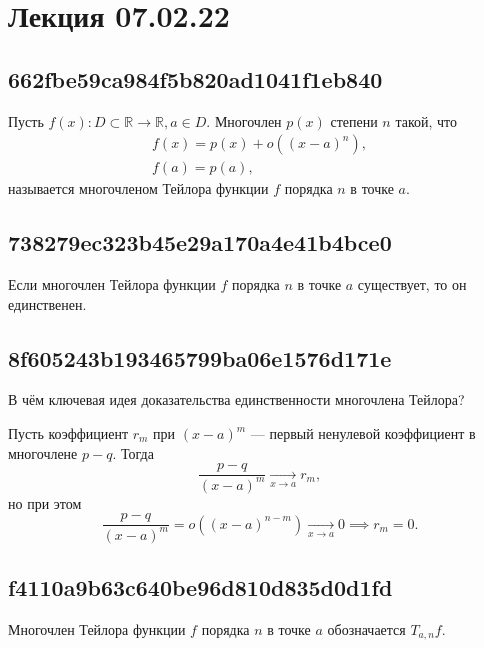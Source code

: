 \documentclass[11pt, a5paper]{article}
\newenvironment{note}[1]{\goodbreak\par\subsection{\hfill \color{lightgray}\tiny #1}}{}
\newenvironment{cloze}[2][\ldots]{\begin{leftbar}}{\end{leftbar}}
\newenvironment{icloze}[2][\ldots]{%
  \ignorespaces\text{\tiny \color{lightgray} \{\{c#2:: }%
}{%
  \text{\tiny \color{lightgray}\}\}}\unskip%
}
\begin{document}
\section{Лекция 07.02.22}
\begin{note}{662fbe59ca984f5b820ad1041f1eb840}
    Пусть \( f(x) : D \subset \mathbb R  \to \mathbb R, a \in D. \)
    \begin{icloze}{2}Многочлен \( p(x) \) степени \( n \)  такой, что \[
        \begin{gathered}
            f(x) = p(x) + o((x - a)^{n}), \\
            f(a) = p(a),
        \end{gathered}
    \]\end{icloze}
    называется \begin{icloze}{1}многочленом Тейлора функции \( f \) порядка \( n \) в точке \( a. \)\end{icloze}
\end{note}

\begin{note}{738279ec323b45e29a170a4e41b4bce0}
    Если многочлен Тейлора функции \( f \) порядка \( n \) в точке \( a \) существует, то \begin{icloze}{1}он единственен.\end{icloze}
\end{note}

\begin{note}{8f605243b193465799ba06e1576d171e}
    В чём ключевая идея доказательства единственности многочлена Тейлора?

    \begin{cloze}{1}
        Пусть коэффициент \( r_m  \) при \( (x - a)^{m} \) --- первый ненулевой коэффициент в многочлене \( p - q \).
        Тогда \[
            \frac{p - q}{(x - a)^{m} } \underset{x \to a}\longrightarrow r_m,
        \] но при этом \[
            \frac{p - q}{(x - a)^{m} } = o((x - a)^{n - m}) \underset{x \to a}\longrightarrow 0 \implies r_m = 0.
        \]
    \end{cloze}
\end{note}

\begin{note}{f4110a9b63c640be96d810d835d0d1fd}
    \begin{icloze}{2}Многочлен Тейлора функции \( f \) порядка \( n \) в точке \( a \)\end{icloze} обозначается \begin{icloze}{1}\( T_{a, n} f.  \)\end{icloze}
\end{note}
\end{document}

